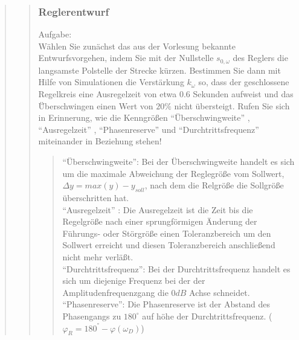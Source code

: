 \begin{quote}
\begin{quote}
\begin{quote}
        \end{quote}

        \subsubsection{Reglerentwurf}
        Aufgabe:\\        
        Wählen Sie zunächst das aus der Vorlesung bekannte Entwurfsvorgehen, indem Sie mit der Nullstelle $s_{0,\omega}$
        des Reglers die langsamste Polstelle der Strecke kürzen. Bestimmen Sie dann mit Hilfe von Simulationen die
        Verstärkung $k_\omega$ so, dass der geschlossene Regelkreis eine Ausregelzeit von etwa $0.6$ Sekunden aufweist
        und das Ü̈berschwingen einen Wert von $20\%$ nicht übersteigt. Rufen Sie sich in Erinnerung, wie die
        Kenngrößen ``Überschwingweite'' , ``Ausregelzeit'' , ``Phasenreserve'' und ``Durchtrittsfrequenz''
        miteinander in Beziehung stehen!
        \begin{quote} 

            \vspace{1em}
            ``Überschwingweite'': Bei der Überschwingweite handelt es sich um die maximale Abweichung der Reglegröße vom
            Sollwert, $\Delta y = max(y) - y_{soll}$, nach dem die Relgröße die Sollgröße überschritten hat.
            \cite{Ueberschwingweite}\\
            
            \vspace{1em}
            ``Ausregelzeit'' : Die Ausregelzeit ist die Zeit bis die Regelgröße nach einer sprungförmigen Änderung der
            Führungs- oder Störgröße einen Toleranzbereich um den Sollwert erreicht und diesen Toleranzbereich anschließend
            nicht mehr verläßt.
            \cite{Ausregelzeit}\\
            
            \vspace{1em}
            ``Durchtrittsfrequenz'': Bei der Durchtrittsfrequenz handelt es sich um diejenige Frequenz bei der der
            Amplitudenfrequenzgang die $0dB$ Achse schneidet.\\

            \vspace{1em}
            ``Phasenreserve'': Die Phasenreserve ist der Abstand des Phasengangs zu $180^\circ$ auf höhe der Durchtrittsfrequenz.
            ($\varphi_R = 180^° - \varphi(\omega_D)$)\\
            

\end{quote}
\end{quote}
\end{quote}
